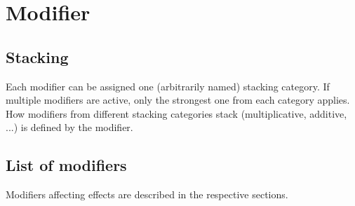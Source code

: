 \chapter{Modifier}

\section{Stacking}

Each modifier can be assigned one (arbitrarily named) stacking category.
If multiple modifiers are active, only the strongest one from each category applies.
How modifiers from different stacking categories stack (multiplicative, additive, ...) is defined by the modifier.

\section{List of modifiers}

Modifiers affecting effects are described in the respective sections.
